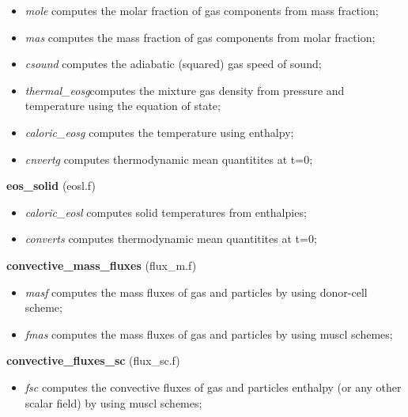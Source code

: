 \begin{itemize}
\item {\em mole} computes the molar fraction of gas components from mass fraction;\\
\item {\em mas} computes the mass fraction of gas components from molar fraction;\\
\item {\em csound} computes the adiabatic (squared) gas speed of sound;\\
\item  {\em thermal\_eosg}computes the mixture gas density from pressure and temperature 
using the equation of state;\\
\item  {\em caloric\_eosg} computes the temperature using enthalpy;
\item  {\em cnvertg} computes thermodynamic mean quantitites at t=0;
\end{itemize}
%
%
{\large{\bf eos\_solid}} (eosl.f)\\
\begin{itemize}
\item {\em caloric\_eosl} computes solid temperatures from enthalpies;\\
\item {\em converts} computes thermodynamic mean quantitites at t=0;\\
\end{itemize}
%
%
{\large{\bf convective\_mass\_fluxes}} (flux\_m.f)\\
\begin{itemize}
\item {\em masf} computes the mass fluxes of gas and particles by using donor-cell scheme;\\
\item {\em fmas} computes the mass fluxes of gas and particles by using muscl schemes;\\
\end{itemize}
%
%
{\large{\bf convective\_fluxes\_sc}} (flux\_sc.f)\\
\begin{itemize}
\item {\em fsc} computes the convective fluxes of gas and particles enthalpy (or any other scalar field)
 by using muscl schemes;\\
\end{itemize}
